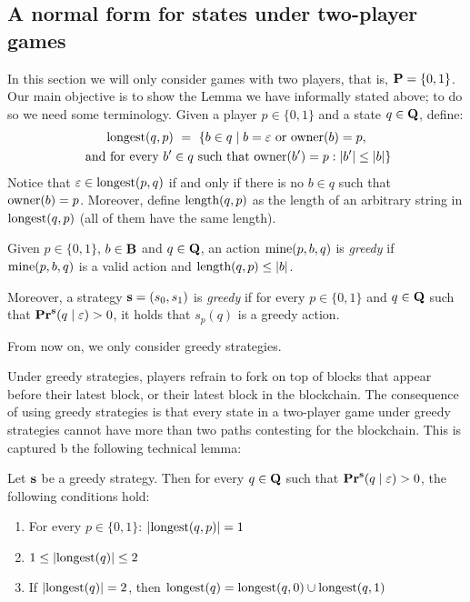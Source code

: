 \subsection{A normal form for states under two-player games} 

In this section we will only consider games with two players, that is, $\mathbf{P} = \{0,1\}$. Our main objective is to show the Lemma we have informally stated above; to do so 
we need some terminology. Given a player $p \in \{0,1\}$ and a state $q \in \mathbf{Q}$, define:
\begin{multline*}
{\text{\rm longest}}(q,p) \ = \ \{ b \in q \mid b = \varepsilon \text{ or } \text{\rm owner}(b) = p,\\
\text{ and for every } b' \in q \text{ such that } \text{\rm owner}(b') = p : |b'| \leq |b|\}
\end{multline*}
Notice that $\varepsilon \in {\text{\rm longest}}(p,q)$ if and only if there is no $b \in q$ such that $\text{\rm owner}(b) = p$. Moreover, define $\text{\rm length}(q,p)$ as the length of an arbitrary string in ${\text{\rm longest}}(q,p)$ (all of them have the same length).
\begin{mydef}\label{def-greedy}
Given $p \in \{0,1\}$, $b \in \mathbf{B}$ and $q \in \mathbf{Q}$,  an action $\text{\rm mine}(p,b,q)$ is {\em greedy} if $\text{\rm mine}(p,b,q)$ is a valid action and $\text{\rm length}(q,p) \leq |b|$.

Moreover, a strategy $\mathbf{s} = (s_0, s_1)$ is {\em greedy} if for every $p \in \{0,1\}$ and  $q \in \mathbf{Q}$ such that $\mathbf{Pr}^{\mathbf{s}}(q \mid \varepsilon) > 0$, it holds that $s_p(q)$ is a greedy action.
\end{mydef}
From now on, we only consider greedy strategies. 

Under greedy strategies, players refrain to fork on top of blocks that appear before their latest block, or their latest block in the blockchain. The consequence of using 
greedy strategies is that every state in a two-player game under greedy strategies cannot have more than two paths contesting for the blockchain. This is captured b the following 
technical lemma: 
\begin{mylem}\label{lem-length-greedy}
Let $\mathbf{s}$ be a greedy strategy. Then for every $q \in \mathbf{Q}$ such that $\mathbf{Pr}^{\mathbf{s}}(q \mid \varepsilon) > 0$, the following conditions hold:
\begin{enumerate}
\item For every $p \in \{0,1\}$: $|{\text{\rm longest}}(q,p)| = 1$ 

\item $1 \leq |{\text{\rm longest}}(q)| \leq 2$

\item If $|{\text{\rm longest}}(q)| = 2$, then ${\text{\rm longest}}(q) = {\text{\rm longest}}(q,0) \cup {\text{\rm longest}}(q,1)$
\end{enumerate}
\end{mylem}

